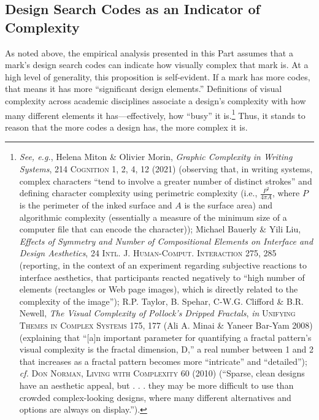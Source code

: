 \documentclass[letterpaper, 11pt, oneside]{article}
\begin{document}
\subsection{Design Search Codes as an Indicator of Complexity}\label{subsec:2A}

As noted above, the empirical analysis presented in this Part assumes that a mark's design search codes can indicate how visually complex that mark is. At a high level of generality, this proposition is self-evident. If a mark has more codes, that means it has more ``significant design elements.'' Definitions of visual complexity across academic disciplines associate a design's complexity with how many different elements it has—effectively, how ``busy'' it is.\footnote{\label{supra24} \textit{See, e.g.}, Helena Miton \& Olivier Morin, \textit{Graphic Complexity in Writing Systems}, 214 \textsc{Cognition} 1, 2, 4, 12 (2021) (observing that, in writing systems, complex characters ``tend to involve a greater number of distinct strokes'' and defining character complexity using perimetric complexity (i.e., $\frac{P^2}{4{\pi}A}$, where $P$ is the perimeter of the inked surface and $A$ is the surface area) and algorithmic complexity (essentially a measure of the minimum size of a computer file that can encode the character)); Michael Bauerly \& Yili Liu, \textit{Effects of Symmetry and Number of Compositional Elements on Interface and Design Aesthetics}, 24 \textsc{Intl. J. Human-Comput. Interaction} 275, 285 (reporting, in the context of an experiment regarding subjective reactions to interface aesthetics, that participants reacted negatively to ``high number of elements (rectangles or Web page images), which is directly related to the complexity of the image''); R.P. Taylor, B. Spehar, C-W.G. Clifford \& B.R. Newell, \textit{The Visual Complexity of Pollock's Dripped Fractals}, \textit{in} \textsc{Unifying Themes in Complex Systems} 175, 177 (Ali A. Minai \& Yaneer Bar-Yam 2008) (explaining that ``[a]n important parameter for quantifying a fractal pattern's visual complexity is the fractal dimension, D,'' a real number between 1 and 2 that increases as a fractal pattern becomes more ``intricate'' and ``detailed''); \textit{cf.} \textsc{Don Norman, Living with Complexity} 60 (2010) (``Sparse, clean designs have an aesthetic appeal, but . . . they may be more difficult to use than crowded complex-looking designs, where many different alternatives and options are always on display.''). } Thus, it stands to reason that the more codes a design has, the more complex it is.
\end{document}
